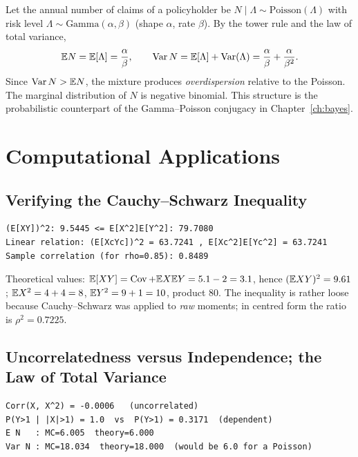 \documentclass[main.tex]{subfiles}
\begin{document}
\begin{example}\label{ex:poisson-gamma}
Let the annual number of claims of a policyholder be $N\mid\Lambda\sim\text{Poisson}(\Lambda)$ with risk level $\Lambda\sim\text{Gamma}(\alpha,\beta)$ (shape $\alpha$, rate $\beta$). By the tower rule and the law of total variance,
\[
\mathbb{E} N=\mathbb{E}[\Lambda]=\frac\alpha\beta,\qquad
\operatorname{Var} N=\mathbb{E}[\Lambda]+\operatorname{Var}(\Lambda)=\frac\alpha\beta+\frac{\alpha}{\beta^2}.
\]
Since $\operatorname{Var} N>\mathbb{E} N$, the mixture produces \emph{overdispersion} relative to the Poisson. The marginal distribution of $N$ is negative binomial. This structure is the probabilistic counterpart of the Gamma--Poisson conjugacy in Chapter~\ref{ch:bayes}.
\end{example}

\section{Computational Applications}

\subsection{Verifying the Cauchy--Schwarz Inequality}

\begin{lstlisting}[style=output]
(E[XY])^2: 9.5445 <= E[X^2]E[Y^2]: 79.7080
Linear relation: (E[XcYc])^2 = 63.7241 , E[Xc^2]E[Yc^2] = 63.7241
Sample correlation (for rho=0.85): 0.8489
\end{lstlisting}

Theoretical values: $\mathbb{E}[XY]=\operatorname{Cov}+\mathbb{E} X\mathbb{E} Y=5.1-2=3.1$, hence $(\mathbb{E} XY)^2=9.61$; $\mathbb{E} X^2=4+4=8$, $\mathbb{E} Y^2=9+1=10$, product $80$. The inequality is rather loose because Cauchy--Schwarz was applied to \emph{raw} moments; in centred form the ratio is $\rho^2=0.7225$.

\subsection{Uncorrelatedness versus Independence; the Law of Total Variance}

\begin{lstlisting}[style=output]
Corr(X, X^2) = -0.0006   (uncorrelated)
P(Y>1 | |X|>1) = 1.0  vs  P(Y>1) = 0.3171  (dependent)
E N   : MC=6.005  theory=6.000
Var N : MC=18.034  theory=18.000  (would be 6.0 for a Poisson)
\end{lstlisting}
\end{document}

